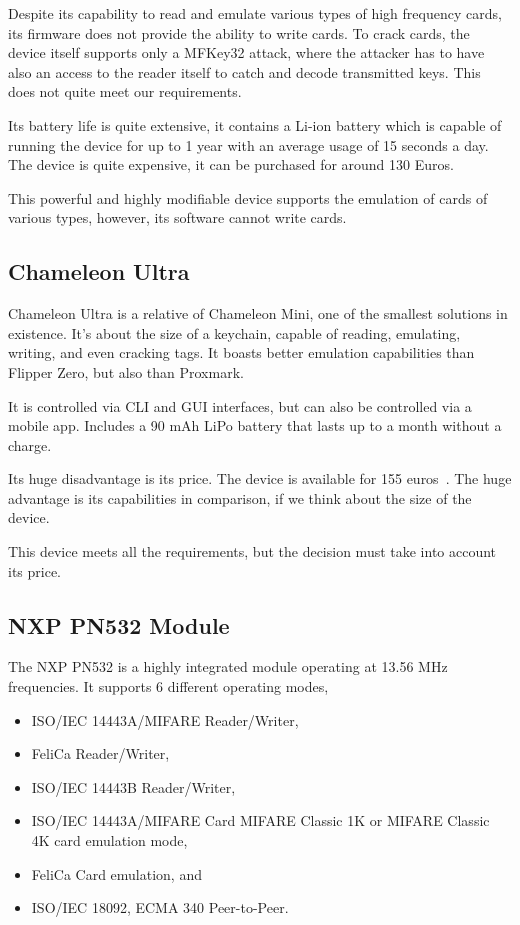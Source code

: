 Despite its capability to read and emulate various types of high frequency cards, its firmware does not provide the ability to write cards. To crack cards, the device itself supports only a MFKey32 attack, where the attacker has to have also an access to the reader itself to catch and decode transmitted keys. This does not quite meet our requirements. ~\cite{lab401chameleon}

Its battery life is quite extensive, it contains a Li-ion battery which is capable of running the device for up to 1 year with an average usage of 15 seconds a day. The device is quite expensive, it can be purchased for around 130 Euros.~\cite{lab401chameleon}

This powerful and highly modifiable device supports the emulation of cards of various types, however, its software cannot write cards.


\subsection{Chameleon Ultra}

Chameleon Ultra is a relative of Chameleon Mini, one of the smallest solutions in existence. It's about the size of a keychain, capable of reading, emulating, writing, and even cracking tags. It boasts better emulation capabilities than Flipper Zero, but also than Proxmark.~\cite{chameleonultra}

It is controlled via CLI and GUI interfaces, but can also be controlled via a mobile app. Includes a 90 mAh LiPo battery that lasts up to a month without a charge.~\cite{chameleonultra}

Its huge disadvantage is its price. The device is available for 155 euros~\cite{chameleonultra}. The huge advantage is its capabilities in comparison, if we think about the size of the device.

This device meets all the requirements, but the decision must take into account its price. 


\subsection{NXP PN532 Module}

The NXP PN532 is a highly integrated module operating at 13.56 MHz frequencies. It supports 6 different operating modes,
\begin{itemize}
    \item ISO/IEC 14443A/MIFARE Reader/Writer,
    \item FeliCa Reader/Writer,
    \item ISO/IEC 14443B Reader/Writer,
    \item ISO/IEC 14443A/MIFARE Card MIFARE Classic 1K or MIFARE Classic 4K card emulation mode,
    \item FeliCa Card emulation, and
    \item ISO/IEC 18092, ECMA 340 Peer-to-Peer.~\cite{pn532doc}
\end{itemize}

